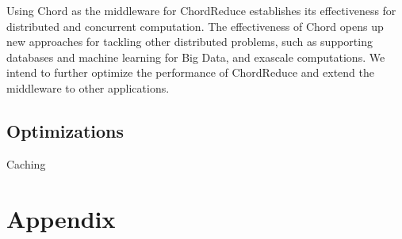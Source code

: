 \documentclass[10pt, conference, compsocconf]{IEEEtran}
\begin{document}
Using Chord as the middleware for ChordReduce establishes its effectiveness for distributed and concurrent computation.
The effectiveness of Chord opens up new approaches for tackling other distributed problems, such as supporting databases and machine learning for Big Data, and exascale computations. We intend to further optimize the performance of ChordReduce and extend the middleware to other applications.
\subsection{Optimizations}

Caching








\section*{Appendix}





\end{document}
